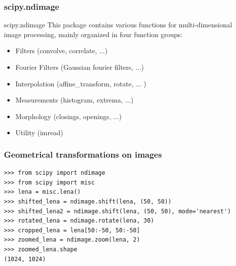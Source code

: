 \documentclass[10pt,colorlinks]{beamer}
\begin{document}

\begin{frame}[fragile]\frametitle{scipy.ndimage}
\begin{block}{scipy.ndimage}
This package contains various functions for multi-dimensional image processing, mainly organized in four function groups:
\begin{itemize}
    \item Filters (convolve, correlate, ...)
    \item Fourier Filters (Gaussian fourier filters, ...)
    \item Interpolation (affine\_transform, rotate, ... )
    \item Measurements (histogram, extrema, ...)
    \item Morphology (closings, openings, ...)
    \item Utility (imread)
\end{itemize}
\end{block}
\end{frame}

\begin{frame}[fragile]\frametitle{Geometrical transformations on images}
\begin{verbatim}
>>> from scipy import ndimage
>>> from scipy import misc
>>> lena = misc.lena()
>>> shifted_lena = ndimage.shift(lena, (50, 50))
>>> shifted_lena2 = ndimage.shift(lena, (50, 50), mode='nearest')
>>> rotated_lena = ndimage.rotate(lena, 30)
>>> cropped_lena = lena[50:-50, 50:-50]
>>> zoomed_lena = ndimage.zoom(lena, 2)
>>> zoomed_lena.shape
(1024, 1024)
\end{verbatim}

\end{frame}
\end{document}
